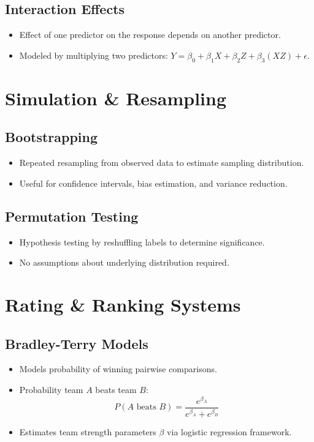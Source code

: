 \documentclass[10pt, landscape]{article}
\begin{document}
\begin{multicols}{3}
\subsection{Interaction Effects}
\begin{itemize}[noitemsep]
    \item Effect of one predictor on the response depends on another predictor.
    \item Modeled by multiplying two predictors: \( Y = \beta_0 + \beta_1X + \beta_2Z + \beta_3(XZ) + \epsilon \).
\end{itemize}

\section{Simulation \& Resampling}

\subsection{Bootstrapping}
\begin{itemize}[noitemsep]
    \item Repeated resampling from observed data to estimate sampling distribution.
    \item Useful for confidence intervals, bias estimation, and variance reduction.
\end{itemize}

\subsection{Permutation Testing}
\begin{itemize}[noitemsep]
    \item Hypothesis testing by reshuffling labels to determine significance.
    \item No assumptions about underlying distribution required.
\end{itemize}

\section{Rating \& Ranking Systems}

\subsection{Bradley-Terry Models}
\begin{itemize}[noitemsep]
    \item Models probability of winning pairwise comparisons.
    \item Probability team \(A\) beats team \(B\):
    \[ P(A \text{ beats } B) = \frac{e^{\beta_A}}{e^{\beta_A} + e^{\beta_B}} \]
    \item Estimates team strength parameters \(\beta\) via logistic regression framework.
\end{itemize}


\end{multicols}
\end{document}
